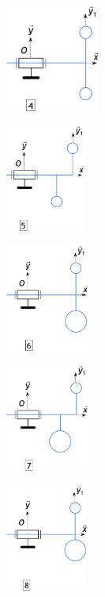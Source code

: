 \documentclass[10pt,fleqn]{article} %
\begin{document}
\begin{multicols}{3}
\begin{center}
\includegraphics[height=3.5cm]{images/fig_04}
\end{center}


\begin{center}
\includegraphics[height=3.5cm]{images/fig_05}
\end{center}


\begin{center}
\includegraphics[height=3.5cm]{images/fig_06}
\end{center}


\begin{center}
\includegraphics[height=3.5cm]{images/fig_07}
\end{center}


\begin{center}
\includegraphics[height=3.5cm]{images/fig_08}
\end{center}



\end{multicols}
\end{document}
